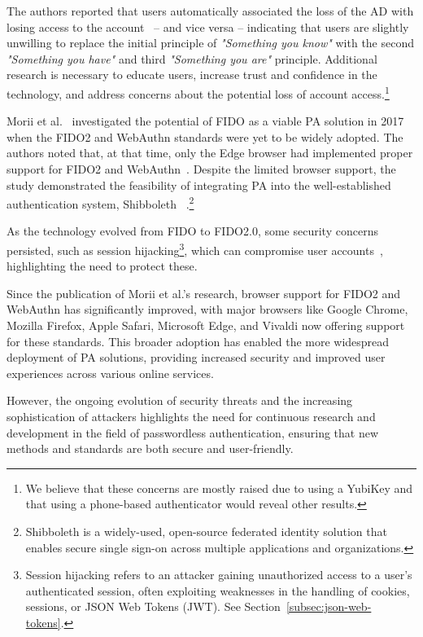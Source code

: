 The authors reported that users automatically associated the loss of the AD with
losing access to the account~\cite{ghrobany2020fido2} -- and vice versa --
indicating that users are slightly unwilling to replace the initial principle of
\textit{"Something you know"} with the second \textit{"Something you have"} and
third \textit{"Something you are"} principle.
Additional research is necessary to educate users, increase trust and confidence
in the technology, and address concerns about the potential loss of account
access.\footnote{
  We believe that these concerns are mostly raised due to using a YubiKey
  and that using a phone-based authenticator would reveal other results.
}

Morii et al.~\cite{morii2017research} investigated the potential of FIDO as a
viable PA solution in 2017 when the FIDO2 and WebAuthn standards were yet to be
widely adopted.
The authors noted that, at that time, only the Edge browser had implemented
proper support for FIDO2 and WebAuthn~\cite{morii2017research}.
Despite the limited browser support, the study demonstrated the feasibility
of integrating PA into the well-established authentication system, Shibboleth
~\cite{shibboleth, morii2017research}.\footnote{
  Shibboleth is a widely-used, open-source federated identity solution that
  enables secure single sign-on across multiple applications and organizations.
}

As the technology evolved from FIDO to FIDO2.0, some security concerns
persisted, such as session hijacking\footnote{
  Session hijacking refers to an attacker gaining unauthorized access to a
  user's authenticated session, often exploiting weaknesses in the handling of
  cookies, sessions, or JSON Web Tokens (JWT).
  See Section~\ref{subsec:json-web-tokens}.
}, which can compromise user accounts~\cite{morii2017research}, highlighting
the need to protect these.

Since the publication of Morii et al.'s research, browser support for FIDO2 and
WebAuthn has significantly improved, with major browsers like Google Chrome,
Mozilla Firefox, Apple Safari, Microsoft Edge, and Vivaldi now offering
support for these standards.
This broader adoption has enabled the more widespread deployment of PA solutions,
providing increased security and improved user experiences across various online
services.

However, the ongoing evolution of security threats and the increasing
sophistication of attackers highlights the need for continuous research and
development in the field of passwordless authentication, ensuring that new
methods and standards are both secure and user-friendly.


